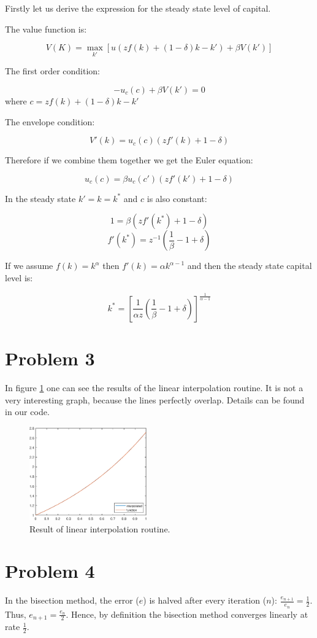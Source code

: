 \documentclass[12pt]{article}
\newcommand{\?}{\stackrel{?}{=}}
\begin{document}
Firstly let us derive the expression for the steady state level of capital.

The value function is:

\[
V(K) = \max_{k'} [ u(zf(k) + (1-\delta)k - k') + \beta V(k')]
\]

The first order condition:

\[
-u_c (c) + \beta V(k') = 0
\]
where $c = zf(k) + (1-\delta)k - k'$

The envelope condition:

\[
V'(k) = u_c (c) (zf'(k) + 1-\delta)
\]

Therefore if we combine them together we get the Euler equation:

\[
u_c (c) = \beta u_c (c') (zf'(k') + 1-\delta) 
\]

In the steady state $k'=k=k^*$ and $c$ is also constant:

\[
1 = \beta (zf'(k^*) + 1 - \delta)
\]
\[
f'(k^*) = z^{-1} \left( \frac{1}{\beta} - 1 + \delta \right)
\]

If we assume $f(k) = k^\alpha$ then $f'(k) = \alpha k^{\alpha-1}$ and then the steady state capital level is:

\[
k^* = \left[ \frac{1}{\alpha z} \left( \frac{1}{\beta} - 1 + \delta \right) \right]^{\frac{1}{\alpha-1}}
\]

\section*{Problem 3}
In figure \ref{fig:lin_int} one can see the results of the linear interpolation routine. It is not a very interesting graph, because the lines perfectly overlap. Details can be found in our code.

\begin{figure}[htbp!]
    \centering
    \includegraphics[width=0.45\textwidth]{PS1/ps3.eps}
    \caption{Result of linear interpolation routine.}
    \label{fig:lin_int}
\end{figure}


\section*{Problem 4}

In the bisection method, the error ($e$) is halved after every iteration ($n$): $\frac{e_{n+1}}{e_n} = \frac{1}{2}$. Thus, $e_{n+1} = \frac{e_n}{2}$. Hence, by definition the bisection method converges linearly at rate $\frac{1}{2}$.
\end{document}
